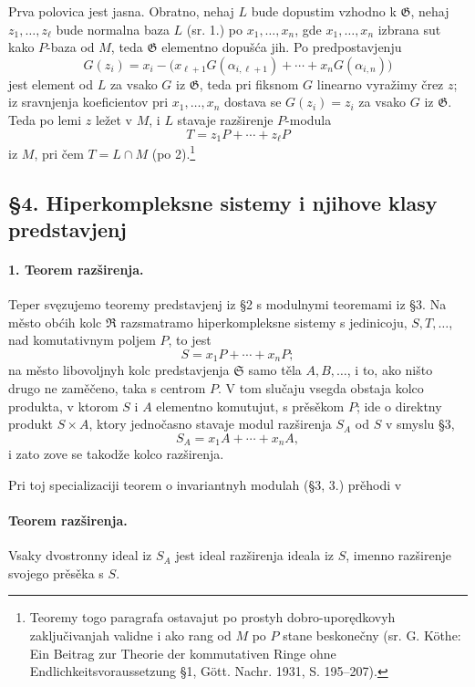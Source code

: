 \documentclass[11pt]{article}
\newcommand{\foreign}[1]{#1}
\providecommand{\frG}{\mathfrak G}
\providecommand{\frR}{\mathfrak R}
\providecommand{\frS}{\mathfrak S}
\begin{document}
Prva polovica jest jasna. Obratno, nehaj \(L\) bude dopustim vzhodno k \(\frG\), nehaj \(z_1,\ldots,z_\ell\) bude normalna baza \(L\) (sr. 1.) po \(x_1,\ldots,x_n\), gde \(x_1,\ldots,x_n\) izbrana sut kako \(P\)-baza od \(M\), teda \(\frG\) elementno dopušća jih. Po predpostavjenju
\[
        G(z_i)=x_i-\bigl(x_{\ell+1}G(\alpha_{i,\ell+1})
              +\cdots+x_nG(\alpha_{i,n})\bigr)
\]
jest element od \(L\) za vsako \(G\) iz \(\frG\), teda pri fiksnom \(G\) linearno vyražimy črez \(z\); iz sravnjenja koeficientov pri \(x_1,\ldots,x_n\) dostava se \(G(z_i)=z_i\) za vsako \(G\) iz \(\frG\). Teda po lemi \(z\) ležet v \(M\), i \(L\) stavaje razširenje \(P\)-modula
\[
        T=z_1P+\cdots+z_\ell P
\]
iz \(M\), pri čem \(T=L\cap M\) (po 2).\footnote{Teoremy togo paragrafa ostavajut po prostyh dobro-uporędkovyh zaključivanjah validne i ako rang od \(M\) po \(P\) stane beskonečny (sr. G. Köthe: \foreign{Ein Beitrag zur Theorie der kommutativen Ringe ohne Endlichkeitsvoraussetzung} §1, Gött. Nachr. 1931, S. 195--207).}

\subsection*{§4. Hiperkompleksne sistemy i njihove klasy predstavjenj}

\paragraph{1. Teorem razširenja.}
Teper svęzujemo teoremy predstavjenj iz §2 s modulnymi teoremami iz §3. Na město obćih kolc \(\frR\) razsmatramo hiperkompleksne sistemy s jedinicoju, \(S,T,\ldots\), nad komutativnym poljem \(P\), to jest
\[
        S=x_1P+\cdots+x_nP;
\]
na město libovoljnyh kolc predstavjenja \(\frS\) samo těla \(A,B,\ldots\), i to, ako ništo drugo ne zaměčeno, taka s centrom \(P\). V tom slučaju vsegda obstaja kolco produkta, v ktorom \(S\) i \(A\) elementno komutujut, s prěsěkom \(P\); ide o direktny produkt \(S\times A\), ktory jednočasno stavaje modul razširenja \(S_A\) od \(S\) v smyslu §3,
\[
        S_A=x_1A+\cdots+x_nA,
\]
i zato zove se takodže kolco razširenja.

Pri toj specializaciji teorem o invariantnyh modulah (§3, 3.) prěhodi v

\paragraph{Teorem razširenja.}
Vsaky dvostronny ideal iz \(S_A\) jest ideal razširenja ideala iz \(S\), imenno razširenje svojego prěsěka s \(S\).
\end{document}
